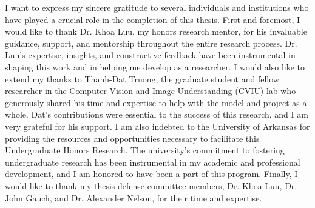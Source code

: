 \begin{frontmatter}
\makefrontmatter 

\begin{acknowledgements} 
I want to express my sincere gratitude to several individuals and institutions who have played a crucial role in the completion of this thesis. First and foremost, I would like to thank Dr. Khoa Luu, my honors research mentor, for his invaluable guidance, support, and mentorship throughout the entire research process. Dr. Luu's expertise, insights, and constructive feedback have been instrumental in shaping this work and in helping me develop as a researcher. I would also like to extend my thanks to Thanh-Dat Truong, the graduate student and fellow researcher in the Computer Vision and Image Understanding (CVIU) lab who generously shared his time and expertise to help with the model and project as a whole. Dat's contributions were essential to the success of this research, and I am very grateful for his support. I am also indebted to the University of Arkansas for providing the resources and opportunities necessary to facilitate this Undergraduate Honors Research. The university's commitment to fostering undergraduate research has been instrumental in my academic and professional development, and I am honored to have been a part of this program. Finally, I would like to thank my thesis defense committee members, Dr. Khoa Luu, Dr. John Gauch, and Dr. Alexander Nelson, for their time and expertise.
\end{acknowledgements}

\tableofcontents
\listoffigures

\newpage


\end{frontmatter}